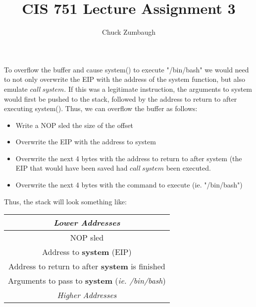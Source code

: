 \documentclass[12pt]{article}
\title{CIS 751 Lecture Assignment 3}
\author{Chuck Zumbaugh}
\begin{document}
\maketitle

To overflow the buffer and cause system() to execute "/bin/bash" we would need to not only overwrite the EIP with the address of the system function, but also emulate $call\ system$. If this was a legitimate instruction, the arguments to system would first be pushed to the stack, followed by the address to return to after executing system(). Thus, we can overflow the buffer as follows:
\begin{itemize}
\item Write a NOP sled the size of the offset
\item Overwrite the EIP with the address to system
\item Overwrite the next 4 bytes with the address to return to after system (the EIP that would have been saved had $call\ system$ been executed.
\item Overwrite the next 4 bytes with the command to execute (ie. "/bin/bash")
\end{itemize}

Thus, the stack will look something like:
\bigbreak
\begin{tabular}{|c|}
\hline
\textit{Lower Addresses} \\
\hline
NOP sled \\
\hline
Address to \textbf{system} (EIP) \\
\hline
Address to return to after \textbf{system} is finished \\
\hline
Arguments to pass to \textbf{system} (\textit{ie. /bin/bash}) \\
\hline
\textit{Higher Addresses} \\
\hline
\end{tabular}
\end{document}
